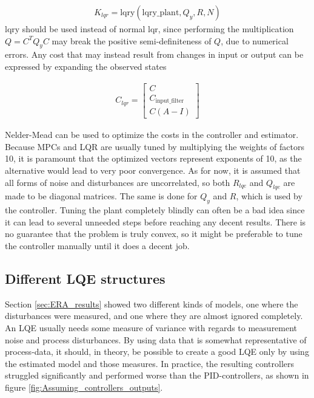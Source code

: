 \begin{align}
    K_{lqr} = \text{lqry} \left( \text{lqry_plant}, Q_y, R, N \right)
\end{align}
$\text{lqry}$ should be used instead of normal $\text{lqr}$, since performing the multiplication $Q = C^T Q_y C$ may break the positive semi-definiteness of $Q$, due to numerical errors. Any cost that may instead result from changes in input or output can be expressed by expanding the observed states


\begin{align}
    C_{lqr} = \begin{bmatrix}
        C\\
        C_{\text{input_filter}}\\
        C\left( A - I \right)
    \end{bmatrix}
\end{align}




\noindent
Nelder-Mead can be used to optimize the costs in the controller and estimator. Because MPCs and LQR are usually tuned by multiplying the weights of factors 10, it is paramount that the optimized vectors represent exponents of 10, as the alternative would lead to very poor convergence. As for now, it is assumed that all forms of noise and disturbances are uncorrelated, so both $R_{lqe}$ and $Q_{lqe}$ are made to be diagonal matrices. The same is done for $Q_y$ and $R$, which is used by the controller. Tuning the plant completely blindly can often be a bad idea since it can lead to several unneeded steps before reaching any decent results. There is no guarantee that the problem is truly convex, so it might be preferable to tune the controller manually until it does a decent job. 

\subsection{Different LQE structures}
Section \ref{sec:ERA_results} showed two different kinds of models, one where the disturbances were measured, and one where they are almost ignored completely. An LQE usually needs some measure of variance with regards to measurement noise and process disturbances. By using data that is somewhat representative of process-data, it should, in theory, be possible to create a good LQE only by using the estimated model and those measures. In practice, the resulting controllers struggled significantly and performed worse than the PID-controllers, as shown in figure \ref{fig:Assuming_controllers_outputs}. 

